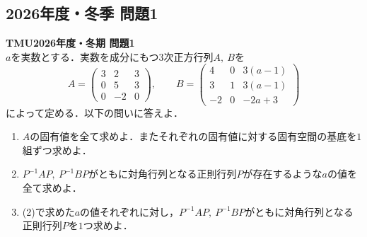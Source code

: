 \documentclass[titlepage]{jsarticle}
\numberwithin{equation}{section}
\begin{document}
\subsection{2026年度・冬季 問題1}
\begin{problem}
\textbf{TMU2026年度・冬期 問題1}\\
$a$を実数とする．実数を成分にもつ$3$次正方行列$A,\ B$を
\[
A=
\begin{pmatrix}
3 & 2 & 3\\
0 & 5 & 3\\
0 & -2 & 0
\end{pmatrix},
\qquad
B=
\begin{pmatrix}
4 & 0 & 3(a-1)\\
3 & 1 & 3(a-1)\\
-2 & 0 & -2a+3
\end{pmatrix}
\]
によって定める．以下の問いに答えよ．

\begin{enumerate}[label=(\arabic*)]
    \item $A$の固有値を全て求めよ．またそれぞれの固有値に対する固有空間の基底を$1$組ずつ求めよ．

    \item $P^{-1}AP,\ P^{-1}BP$がともに対角行列となる正則行列$P$が存在するような$a$の値を全て求めよ．

    \item (2)で求めた$a$の値それぞれに対し，$P^{-1}AP,\ P^{-1}BP$がともに対角行列となる正則行列$P$を$1$つ求めよ．
\end{enumerate}
\end{problem}
\end{document}
